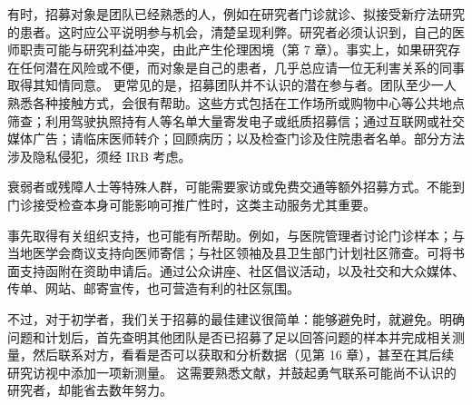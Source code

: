 有时，招募对象是团队已经熟悉的人，例如在研究者门诊就诊、拟接受新疗法研究的患者。这时应公平说明参与机会，清楚呈现利弊。研究者必须认识到，自己的医师职责可能与研究利益冲突，由此产生伦理困境（第 7 章）。事实上，如果研究存在任何潜在风险或不便，而对象是自己的患者，几乎总应请一位无利害关系的同事取得其知情同意。
更常见的是，招募团队并不认识的潜在参与者。团队至少一人熟悉各种接触方式，会很有帮助。这些方式包括在工作场所或购物中心等公共地点筛查；利用驾驶执照持有人等名单大量寄发电子或纸质招募信；通过互联网或社交媒体广告；请临床医师转介；回顾病历；以及检查门诊及住院患者名单。部分方法涉及隐私侵犯，须经 IRB 考虑。

衰弱者或残障人士等特殊人群，可能需要家访或免费交通等额外招募方式。不能到门诊接受检查本身可能影响可推广性时，这类主动服务尤其重要。

事先取得有关组织支持，也可能有所帮助。例如，与医院管理者讨论门诊样本；与当地医学会商议支持向医师寄信；与社区领袖及县卫生部门计划社区筛查。可将书面支持函附在资助申请后。通过公众讲座、社区倡议活动，以及社交和大众媒体、传单、网站、邮寄宣传，也可营造有利的社区氛围。

不过，对于初学者，我们关于招募的最佳建议很简单：能够避免时，就避免。明确问题和计划后，首先查明其他团队是否已招募了足以回答问题的样本并完成相关测量，然后联系对方，看看是否可以获取和分析数据（见第 16 章），甚至在其后续研究访视中添加一项新测量。
这需要熟悉文献，并鼓起勇气联系可能尚不认识的研究者，却能省去数年努力。

